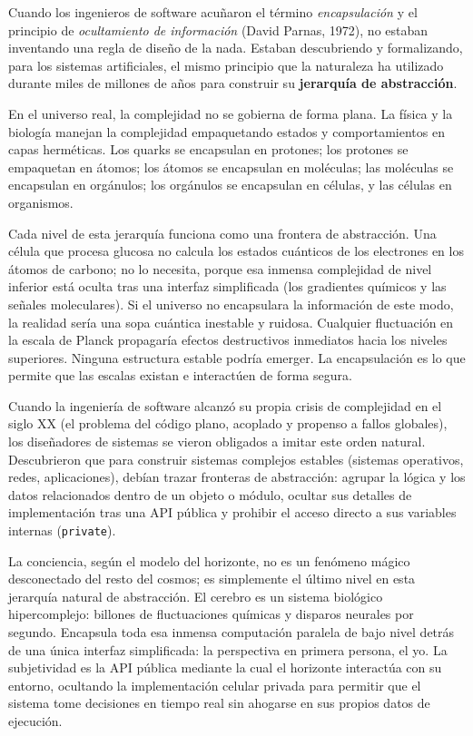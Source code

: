 
\noindent Cuando los ingenieros de software acuñaron el término \emph{encapsulación} y el principio de \emph{ocultamiento de información} (David Parnas, 1972), no estaban inventando una regla de diseño de la nada. Estaban descubriendo y formalizando, para los sistemas artificiales, el mismo principio que la naturaleza ha utilizado durante miles de millones de años para construir su \textbf{jerarquía de abstracción}.

En el universo real, la complejidad no se gobierna de forma plana. La física y la biología manejan la complejidad empaquetando estados y comportamientos en capas herméticas. Los quarks se encapsulan en protones; los protones se empaquetan en átomos; los átomos se encapsulan en moléculas; las moléculas se encapsulan en orgánulos; los orgánulos se encapsulan en células, y las células en organismos.

Cada nivel de esta jerarquía funciona como una frontera de abstracción. Una célula que procesa glucosa no calcula los estados cuánticos de los electrones en los átomos de carbono; no lo necesita, porque esa inmensa complejidad de nivel inferior está oculta tras una interfaz simplificada (los gradientes químicos y las señales moleculares). Si el universo no encapsulara la información de este modo, la realidad sería una sopa cuántica inestable y ruidosa. Cualquier fluctuación en la escala de Planck propagaría efectos destructivos inmediatos hacia los niveles superiores. Ninguna estructura estable podría emerger. La encapsulación es lo que permite que las escalas existan e interactúen de forma segura.

Cuando la ingeniería de software alcanzó su propia crisis de complejidad en el siglo XX (el problema del código plano, acoplado y propenso a fallos globales), los diseñadores de sistemas se vieron obligados a imitar este orden natural. Descubrieron que para construir sistemas complejos estables (sistemas operativos, redes, aplicaciones), debían trazar fronteras de abstracción: agrupar la lógica y los datos relacionados dentro de un objeto o módulo, ocultar sus detalles de implementación tras una API pública y prohibir el acceso directo a sus variables internas (\texttt{private}).

La conciencia, según el modelo del horizonte, no es un fenómeno mágico desconectado del resto del cosmos; es simplemente el último nivel en esta jerarquía natural de abstracción. El cerebro es un sistema biológico hipercomplejo: billones de fluctuaciones químicas y disparos neurales por segundo. Encapsula toda esa inmensa computación paralela de bajo nivel detrás de una única interfaz simplificada: la perspectiva en primera persona, el yo. La subjetividad es la API pública mediante la cual el horizonte interactúa con su entorno, ocultando la implementación celular privada para permitir que el sistema tome decisiones en tiempo real sin ahogarse en sus propios datos de ejecución.

